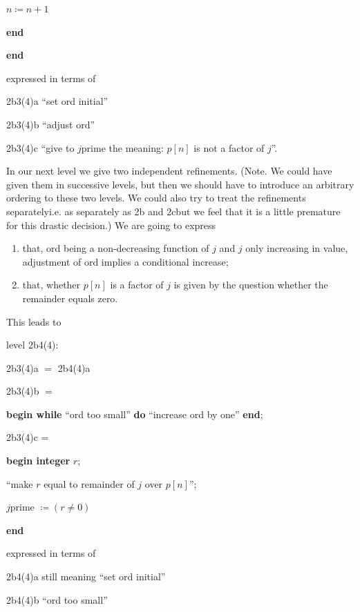 \noindent
\quad\quad\quad $n \coloneq n + 1$

\noindent
\quad\textbf{end}

\noindent
\textbf{end}

\noindent
expressed in terms of

\noindent
2b3(4)a\tabto{5em} ``set ord initial''

\noindent
2b3(4)b\tabto{5em} ``adjust ord''

\noindent
2b3(4)c\tabto{5em} ``give to $j$prime the meaning: $p[n]$ is not a factor of $j$''. 

In our next level we give two independent refinements. (Note. We could have given them in successive levels, but then we should have to introduce an arbitrary ordering to these two levels. We could also try to treat the refinements separately\textemdash{}i.e. as separately as 2b and 2c\textemdash{}but we feel that it is a little premature for this drastic decision.) We are going to express

\begin{enumerate}[leftmargin=2\parindent, label=(\arabic*)]
	\item that, ord being a non-decreasing function of $j$ and $j$ only increasing in value, adjustment of ord implies a conditional increase;

	\item that, whether $p[n]$ is a factor of $j$ is given by the question whether the remainder equals zero.
\end{enumerate}

\noindent
This leads to

\noindent
level 2b4(4):

\noindent
2b3(4)a $=$ 2b4(4)a

\noindent
2b3(4)b $=$

\noindent
\textbf{begin while} ``ord too small'' \textbf{do} ``increase ord by one'' \textbf{end};

\noindent
2b3(4)c =

\noindent
\textbf{begin integer} $r$;

\noindent
\quad ``make $r$ equal to remainder of $j$ over $p[n]$'';

\noindent
\quad $j$prime $\coloneq (r \neq 0)$

\noindent
\textbf{end}

\noindent
expressed in terms of

\noindent
2b4(4)a\tabto{5em} still meaning ``set ord initial''

\noindent
2b4(4)b\tabto{5em} ``ord too small''

